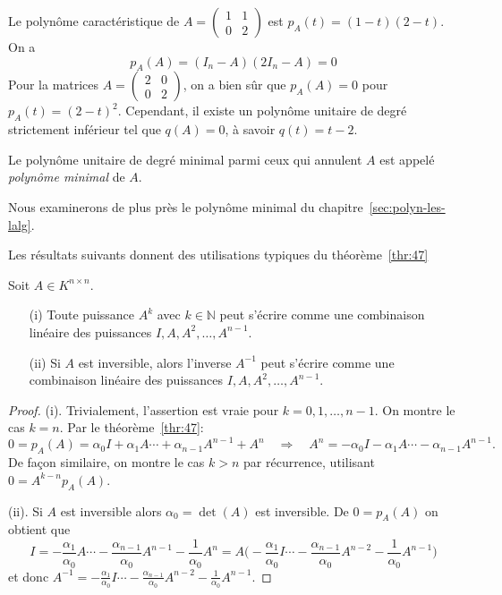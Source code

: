\begin{example}
Le polyn\^ome caract\'eristique de $A = \left( \begin{array}{cc} 1 & 1 \\ 0 & 2
\end{array} \right)$ est $p_A(t) = (1-t)(2-t)$. On a 
\[
 p_A(A) = (I_n-A)(2I_n-A) = 0 
\]
Pour la matrices $A = \left( \begin{array}{cc} 2 & 0 \\ 0 & 2 \end{array}
\right)$, on a bien sûr que $p_A(A) = 0$ pour $p_A(t) = (2-t)^2$. Cependant, il existe un polyn\^ome unitaire de degr\'e strictement inférieur tel que $q(A) = 0$, à savoir $q(t) = t-2$. 

\begin{definition}
  \label{def:44}
  Le polyn\^ome unitaire de degr\'e minimal parmi ceux qui annulent $A$ est appelé \emph{polyn\^ome minimal} de $A$.
\end{definition}

Nous examinerons de plus près le polyn{\^o}me minimal du chapitre~\ref{sec:polyn-les-lalg}.
\end{example}

Les résultats suivants donnent des utilisations typiques du théorème~\ref{thr:47}
\begin{corollary} Soit $A \in K^{n ×n}$.
\begin{enumerate}
\item[(i)] Toute puissance $A^k$ avec $k∈ℕ$ peut s'\'ecrire comme une combinaison lin\'eaire des puissances $I,A,A^2,\ldots,A^{n-1}$.
\item[(ii)] Si $A$ est inversible, alors l'inverse $A^{-1}$ peut s'\'ecrire comme une combinaison lin\'eaire des puissances $I,A,A^2,\ldots,A^{n-1}$.
\end{enumerate}
\end{corollary}

\begin{proof}
 (i). Trivialement, l'assertion est vraie pour $k = 0,1,\ldots,n-1$.
On montre le cas $k = n$. Par le théorème~\ref{thr:47}:
\[
 0 = p_A(A) = \alpha_0 I + \alpha_1 A  \cdots + \alpha_{n-1} A^{n-1} + A^n \quad
\Rightarrow \quad A^n = 
-\alpha_0 I - \alpha_1 A  \cdots - \alpha_{n-1} A^{n-1}.
\]
De fa\c{c}on similaire, on montre le cas $k>n$ par r\'ecurrence, utilisant $0 = A^{k-n} p_A(A)$.

(ii). Si $A$ est inversible alors $\alpha_0 = \det(A)$ est inversible. De $0 = p_A(A)$ on obtient que
\[
  I = -\frac{\alpha_1}{\alpha_0} A  \cdots -\frac{\alpha_{n-1}}{\alpha_0}
A^{n-1} -\frac{1}{\alpha_0} A^n = A \Big( -\frac{\alpha_1}{\alpha_0} I  \cdots
-\frac{\alpha_{n-1}}{\alpha_0} A^{n-2} -\frac{1}{\alpha_0} A^{n-1} \Big)
\]
et donc $A^{-1} = -\frac{\alpha_1}{\alpha_0} I  \cdots
-\frac{\alpha_{n-1}}{\alpha_0} A^{n-2} -\frac{1}{\alpha_0} A^{n-1}$.
\end{proof}




